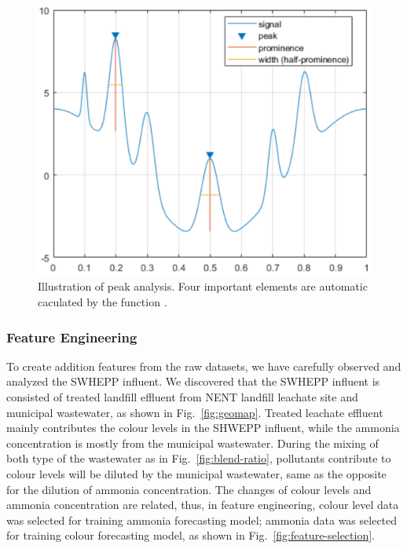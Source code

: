\begin{figure}[h]
    \centering
    \includegraphics[width=0.55\columnwidth]{imgs/pre-processing/prominence.png}
    \caption{Illustration of peak analysis. Four important elements are automatic caculated by the function \citep{mathworksDocumentationFindpeaks2022}.}
    \label{fig:prominence}
 \end{figure}

\subsubsection{Feature Engineering}
To create addition features from the raw datasets, we have carefully observed and analyzed the SWHEPP influent. We discovered that the SWHEPP influent is consisted of treated landfill effluent from NENT landfill leachate site and municipal wastewater, as shown in Fig.~\ref{fig:geomap}. Treated leachate effluent mainly contributes the colour levels in the SHWEPP influent, while the ammonia concentration is mostly from the municipal wastewater. During the mixing of both type of the wastewater as in Fig.~\ref{fig:blend-ratio}, pollutants contribute to colour levels will be diluted by the municipal wastewater, same as the opposite for the dilution of ammonia concentration. The changes of colour levels and ammonia concentration are related, thus, in feature engineering, colour level data was selected for training ammonia forecasting model; ammonia data was selected for training colour forecasting model, as shown in Fig.~\ref{fig:feature-selection}.

